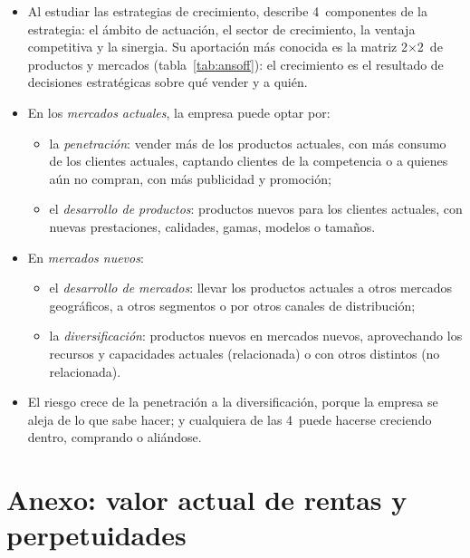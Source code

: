 \documentclass[11pt]{article}
\begin{document}
\begin{itemize}
\item Al estudiar las estrategias de crecimiento, \textcite{Ansoff1957Strategies} describe 4~componentes de la estrategia: el ámbito de actuación, el sector de crecimiento, la ventaja competitiva y la sinergia. Su aportación más conocida es la matriz 2×2~de productos y mercados (tabla~\ref{tab:ansoff}): el crecimiento es el resultado de decisiones estratégicas sobre qué vender y a quién.
\item En los \emph{mercados actuales}, la empresa puede optar por:
  \begin{itemize}
  \item la \emph{penetración}: vender más de los productos actuales, con más consumo de los clientes actuales, captando clientes de la competencia o a quienes aún no compran, con más publicidad y promoción;
  \item el \emph{desarrollo de productos}: productos nuevos para los clientes actuales, con nuevas prestaciones, calidades, gamas, modelos o tamaños.
  \end{itemize}
\item En \emph{mercados nuevos}:
  \begin{itemize}
  \item el \emph{desarrollo de mercados}: llevar los productos actuales a otros mercados geográficos, a otros segmentos o por otros canales de distribución;
  \item la \emph{diversificación}: productos nuevos en mercados nuevos, aprovechando los recursos y capacidades actuales (relacionada) o con otros distintos (no relacionada).
  \end{itemize}
\item El riesgo crece de la penetración a la diversificación, porque la empresa se aleja de lo que sabe hacer; y cualquiera de las 4~puede hacerse creciendo dentro, comprando o aliándose.
\end{itemize}

\section{Anexo: valor actual de rentas y perpetuidades}\label{anexo:perpetuidades}
\end{document}
